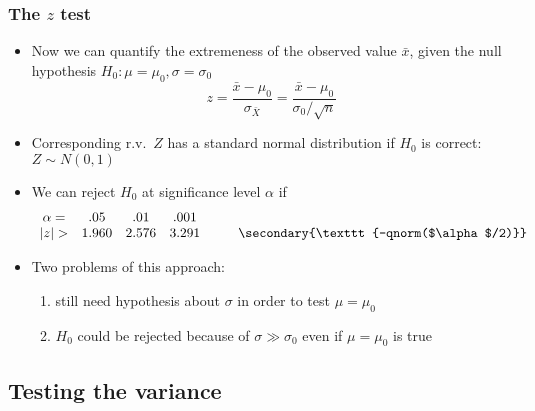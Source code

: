 \documentclass[t]{beamer} %
\begin{document}
\begin{frame}
  \frametitle{The $z$ test}

  \begin{itemize}
  \item Now we can quantify the extremeness of the observed value $\bar{x}$,
    given the null hypothesis $H_0: \mu=\mu_0, \sigma=\sigma_0$
    \[
    z = \frac{\bar{x} - \mu_0}{\sigma_{\bar{X}}}
     = \frac{\bar{x} - \mu_0}{\sigma_0 / \sqrt{n}}
    \]
  \item Corresponding r.v.\ $Z$ has a standard normal distribution if $H_0$ is
    correct: $Z \sim N(0,1)$%
    \pause
  \item We can reject $H_0$ at significance level $\alpha$ if
    \[
    \begin{array}{c ccc @{\hspace{1cm}} c}
      \alpha = & .05 & .01 & .001 & \\
      \abs{z} > & 1.960 & 2.576 & 3.291 & \text{\secondary{\texttt{-qnorm($\alpha$/2)}}}
    \end{array}
    \]
    \pause\ungap
  \item Two problems of this approach:
    \begin{enumerate}
    \item still need hypothesis about $\sigma$ in order to test $\mu=\mu_0$
    \item $H_0$ could be rejected because of $\sigma \gg \sigma_0$ even if
      $\mu=\mu_0$ is true
    \end{enumerate}
  \end{itemize}
\end{frame}

\subsection{Testing the variance}
\end{document}
